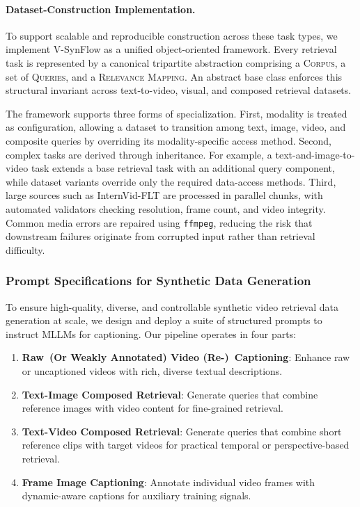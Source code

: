 \paragraph{Dataset-Construction Implementation.}
To support scalable and reproducible construction across these task types, we implement V-SynFlow as a unified object-oriented framework. Every retrieval task is represented by a canonical tripartite abstraction comprising a \textsc{Corpus}, a set of \textsc{Queries}, and a \textsc{Relevance Mapping}. An abstract base class enforces this structural invariant across text-to-video, visual, and composed retrieval datasets.

The framework supports three forms of specialization. First, modality is treated as configuration, allowing a dataset to transition among text, image, video, and composite queries by overriding its modality-specific access method. Second, complex tasks are derived through inheritance. For example, a text-and-image-to-video task extends a base retrieval task with an additional query component, while dataset variants override only the required data-access methods. Third, large sources such as InternVid-FLT are processed in parallel chunks, with automated validators checking resolution, frame count, and video integrity. Common media errors are repaired using \texttt{ffmpeg}, reducing the risk that downstream failures originate from corrupted input rather than retrieval difficulty.

\subsubsection{Prompt Specifications for Synthetic Data Generation}\label{gve:sec:prompt_specs}

To ensure high-quality, diverse, and controllable synthetic video retrieval data generation at scale, we design and deploy a suite of structured prompts to instruct MLLMs for captioning. Our pipeline operates in four parts:

\begin{enumerate}
    \item \textbf{Raw~(Or Weakly Annotated) Video (Re-)~Captioning}: Enhance raw or uncaptioned videos with rich, diverse textual descriptions.
    \item \textbf{Text-Image Composed Retrieval}: Generate queries that combine reference images with video content for fine-grained retrieval.
    \item \textbf{Text-Video Composed Retrieval}: Generate queries that combine short reference clips with target videos for practical temporal or perspective-based retrieval.
    \item \textbf{Frame Image Captioning}: Annotate individual video frames with dynamic-aware captions for auxiliary training signals.
\end{enumerate}


